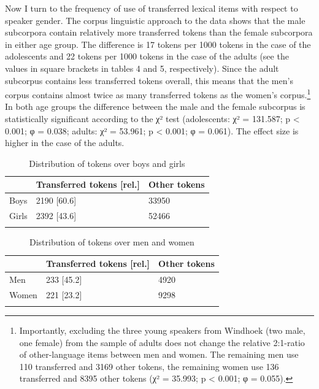\documentclass[output=paper]{langsci/langscibook}
\begin{document}
Now I turn to the frequency of use of transferred lexical items with respect to speaker gender. The corpus linguistic approach to the data shows that the male subcorpora contain relatively more transferred tokens than the female subcorpora in either age group. The difference is 17 tokens per 1000 tokens in the case of the adolescents and 22 tokens per 1000 tokens in the case of the adults (see the values in square brackets in tables 4 and 5, respectively). Since the adult subcorpus contains less transferred tokens overall, this means that the men’s corpus contains almost twice as many transferred tokens as the women’s corpus.\footnote{Importantly, excluding the three young speakers from Windhoek (two male, one female) from the sample of adults does not change the relative 2:1-ratio of other-language items between men and women. The remaining men use 110 transferred and 3169 other tokens, the remaining women use 136 transferred and 8395 other tokens (χ² = 35.993; p < 0.001; φ = 0.055).} In both age groups the difference between the male and the female subcorpus is statistically significant according to the χ² test (adolescents: χ² = 131.587; p < 0.001; φ = 0.038; adults: χ² = 53.961; p < 0.001; φ = 0.061). The effect size is higher in the case of the adults.

 \begin{table}
\begin{tabularx}{0.6\textwidth}{XYY}
\lsptoprule
 & Transferred tokens {[}rel.{]} & Other tokens\\
\hline
{Boys} & {2190 {[}60.6{]}} & {33950}\\
{Girls} & {2392 {[}43.6{]}} & {52466}\\
\lspbottomrule
\end{tabularx}
\caption{Distribution of tokens over boys and girls}
\label{tab:bracke:4}
\end{table}  

  

  
  \begin{table}
\begin{tabularx}{0.6\textwidth}{XYY} 
\lsptoprule
& Transferred tokens {[}rel.{]} & {Other tokens}\\
\hline
{Men} & {233 {[}45.2{]}} & {4920}\\
{Women} & {221 {[}23.2{]}} & {9298}\\
\lspbottomrule
\end{tabularx}
\caption{Distribution of tokens over men and women}
\label{tab:bracke:5}
\end{table}  
\end{document}
